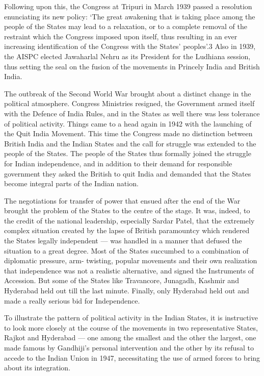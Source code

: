 Following upon this, the Congress at Tripuri in March 1939 passed a resolution enunciating its new policy: `The great awakening that is taking place among the people of the States may lead to a relaxation, or to a complete removal of the restraint which the Congress imposed upon itself, thus resulting in an ever increasing identification of the Congress with the States' peoples'.3 Also in 1939, the AISPC elected Jawaharlal Nehru as its President for the Ludhiana session, thus setting the seal on the fusion of the movements in Princely India and British India. 

The outbreak of the Second World War brought about a distinct change in the political atmosphere. Congress Ministries resigned, the Government armed itself with the Defence of India Rules, and in the States as well there was less tolerance of political activity. Things came to a head again in 1942 with the launching of the Quit India Movement. This time the Congress made no distinction between British India and the Indian States and the call for struggle was extended to the people of the States. The people of the States thus formally joined the struggle for Indian independence, and in addition to their demand for responsible government they asked the British to quit India and demanded that the States become integral parts of the Indian nation. 

The negotiations for transfer of power that ensued after the end of the War brought the problem of the States to the centre of the stage. It was, indeed, to the credit of the national leadership, especially Sardar Patel, that the extremely complex situation created by the lapse of British paramountcy which rendered the States legally independent — was handled in a manner that defused the situation to a great degree. Most of the States succumbed to a combination of diplomatic pressure, arm- twisting, popular movements and their own realization that independence was not a realistic alternative, and signed the Instruments of Accession. But some of the States like Travancore, Junagadh, Kashmir and Hyderabad held out till the last minute. Finally, only Hyderabad held out and made a really serious bid for Independence. 

To illustrate the pattern of political activity in the Indian States, it is instructive to look more closely at the course of the movements in two representative States, Rajkot and Hyderabad — one among the smallest and the other the largest, one made famous by Gandhiji's personal intervention and the other by its refusal to accede to the Indian Union in 1947, necessitating the use of armed forces to bring about its integration.

